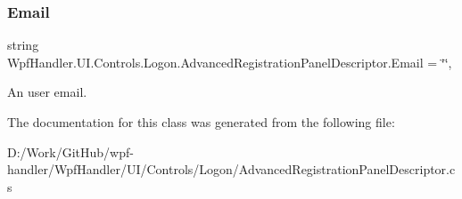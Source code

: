 \subsubsection{\texorpdfstring{Email}{Email}}
{\footnotesize\ttfamily string Wpf\+Handler.\+U\+I.\+Controls.\+Logon.\+Advanced\+Registration\+Panel\+Descriptor.\+Email = \char`\"{}\char`\"{}\hspace{0.3cm}{\ttfamily [get]}, {\ttfamily [set]}}



An user email. 



The documentation for this class was generated from the following file\+:\begin{DoxyCompactItemize}
\item 
D\+:/\+Work/\+Git\+Hub/wpf-\/handler/\+Wpf\+Handler/\+U\+I/\+Controls/\+Logon/Advanced\+Registration\+Panel\+Descriptor.\+cs\end{DoxyCompactItemize}
